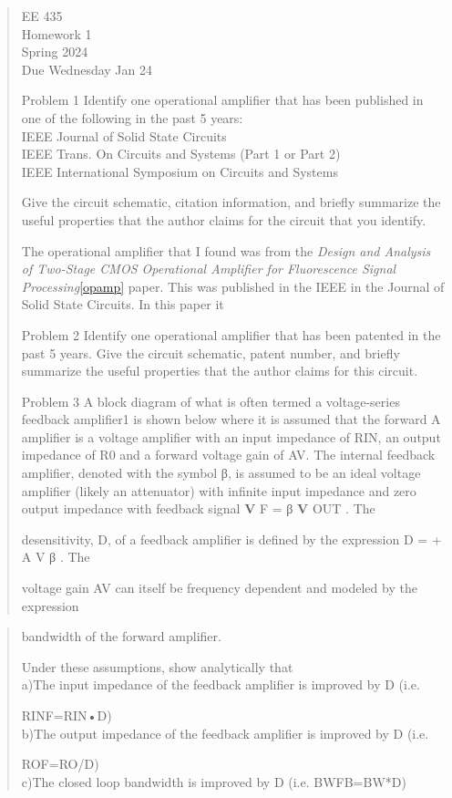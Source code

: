 \documentclass[10pt,a4paper]{article}
\author{}
\date{}
\begin{document}
\begin{quote}
EE 435\\
Homework 1\\
Spring 2024\\
Due Wednesday Jan 24

Problem 1 Identify one operational amplifier that has been published in
one of the following in the past 5 years:\\
IEEE Journal of Solid State Circuits\\
IEEE Trans. On Circuits and Systems (Part 1 or Part 2)\\
IEEE International Symposium on Circuits and Systems

Give the circuit schematic, citation information, and briefly summarize
the useful properties that the author claims for the circuit that you
identify.


The operational amplifier that I found was from the \textit{Design and Analysis of Two-Stage CMOS Operational Amplifier for Fluorescence Signal Processing}\ref{opamp} paper. This was published in the IEEE in the Journal of Solid State Circuits. In this paper it 


Problem 2 Identify one operational amplifier that has been patented in
the past 5 years. Give the circuit schematic, patent number, and briefly
summarize the useful properties that the author claims for this circuit.

Problem 3 A block diagram of what is often termed a voltage-series
feedback amplifier1 is shown below where it is assumed that the forward
A amplifier is a voltage amplifier with an input impedance of RIN, an
output impedance of R0 and a forward voltage gain of AV. The internal
feedback amplifier, denoted with the symbol β, is assumed to be an ideal
voltage amplifier (likely an attenuator) with infinite input impedance
and zero output impedance with feedback signal \textbf{V} F = β
\textbf{V} OUT . The

desensitivity, D, of a feedback amplifier is defined by the expression D
= + A V β . The

voltage gain AV can itself be frequency dependent and modeled by the
expression
\end{quote}



\begin{quote}
bandwidth of the forward amplifier.

Under these assumptions, show analytically that\\
a)The input impedance of the feedback amplifier is improved by D (i.e.

RINF=RIN•D)\\
b)The output impedance of the feedback amplifier is improved by D (i.e.

ROF=RO/D)\\
c)The closed loop bandwidth is improved by D (i.e. BWFB=BW*D)
\end{quote}
\end{document}
